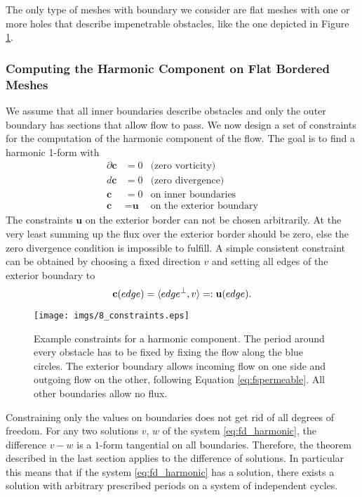 The only type of meshes with boundary we consider are flat meshes with one or more holes that describe impenetrable obstacles, like the one depicted in Figure \ref{fig:fd_harmconstraints}.


\subsubsection{Computing the Harmonic Component on Flat Bordered Meshes}

We assume that all inner boundaries describe obstacles and only the outer boundary has sections that allow flow to pass. We now design a set of constraints for the computation of the harmonic component of the flow. The goal is to find a harmonic 1-form with
\begin{align}
\partial \textbf{c} &= 0 & \text{(zero vorticity)}\nonumber\\ 
d \textbf{c} &= 0 & \text{(zero divergence)}\nonumber\\
\textbf{c} &= 0 & \text{on inner boundaries}\nonumber\\
\textbf{c} &= \textbf{u} & \text{on the exterior boundary}
\label{eq:fd_harmonic}
\end{align}
The constraints $\textbf{u}$ on the exterior border can not be chosen arbitrarily. At the very least summing up the flux over the exterior border should be zero, else the zero divergence condition is impossible to fulfill. A simple consistent constraint can be obtained by choosing a fixed direction $v$ and setting all edges of the exterior boundary to
\begin{equation}\textbf{c}(edge) = \langle edge^\perp, v\rangle=: \textbf{u}(edge) \label{eq:fspermeable}.\end{equation}


\begin{figure}%
\begin{center}
\texttt{[image: imgs/8\_constraints.eps]}%
\end{center}
\caption{Example constraints for a harmonic component. The period around every obstacle has to be fixed by fixing the flow along the blue circles. The exterior boundary allows incoming flow on one side and outgoing flow on the other, following Equation \ref{eq:fspermeable}. All other boundaries allow no flux.}%
\label{fig:fd_harmconstraints}%
\end{figure}


Constraining only the values on boundaries does not get rid of all degrees of freedom. For any two solutions $v$, $w$ of the system \ref{eq:fd_harmonic}, the difference $v-w$ is a $1$-form tangential on all boundaries. Therefore, the theorem described in the last section applies to the difference of solutions. 
In particular this means that if the system \ref{eq:fd_harmonic} has a solution, there exists a solution with arbitrary prescribed periods on a system of independent cycles. 

